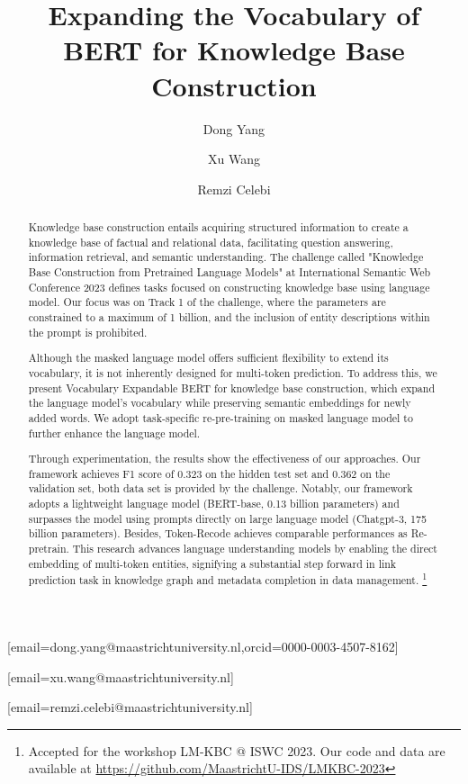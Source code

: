 \documentclass[]{ceurart}
\begin{document}


\title{Expanding the Vocabulary of BERT for Knowledge Base Construction}


\author[1]{Dong Yang}[email=dong.yang@maastrichtuniversity.nl,orcid=0000-0003-4507-8162]


\author[1]{Xu Wang}[email=xu.wang@maastrichtuniversity.nl]

\author[1]{Remzi Celebi}[email=remzi.celebi@maastrichtuniversity.nl]



\address[1]{Institute of Data Science, Department of Advanced Computing Sciences, Maastricht University, The Netherlands}



\begin{abstract}
Knowledge base construction entails acquiring structured information to create a knowledge base of factual and relational data, facilitating question answering, information retrieval, and semantic understanding. The challenge called "Knowledge Base Construction from Pretrained Language Models" at International Semantic Web Conference 2023 defines tasks focused on constructing knowledge base using language model. Our focus was on Track 1 of the challenge, where the parameters are constrained to a maximum of 1 billion, and the inclusion of entity descriptions within the prompt is prohibited.

Although the masked language model offers sufficient flexibility to extend its vocabulary, it is not inherently designed for multi-token prediction. To address this, we present Vocabulary Expandable BERT for knowledge base construction, which expand the language model's vocabulary while preserving semantic embeddings for newly added words. We adopt task-specific re-pre-training on masked language model to further enhance the language model.

Through experimentation, the results show the effectiveness of our approaches. Our framework achieves F1 score of 0.323 on the hidden test set and 0.362 on the validation set, both data set is provided by the challenge. Notably, our framework adopts a lightweight language model (BERT-base, 0.13 billion parameters) and surpasses the model using prompts directly on large language model (Chatgpt-3, 175 billion parameters). Besides, Token-Recode achieves comparable performances as Re-pretrain. This research advances language understanding models by enabling the direct embedding of multi-token entities, signifying a substantial step forward in link prediction task in knowledge graph and metadata completion in data management.
  \footnote{Accepted for the workshop LM-KBC @ ISWC 2023. Our code and data are available at \url{https://github.com/MaastrichtU-IDS/LMKBC-2023}}
\end{abstract}
\end{document}
